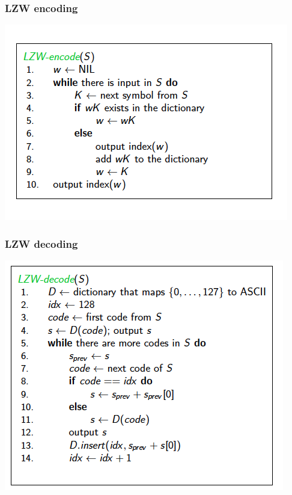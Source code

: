 \documentclass{article}
\begin{document}
\subsubsection*{LZW encoding}
\begin{center}
\includegraphics[scale=0.7]{1}
\end{center}

\subsubsection*{LZW decoding}
\begin{center}
\includegraphics[scale=0.65]{2}
\end{center}
\end{document}
